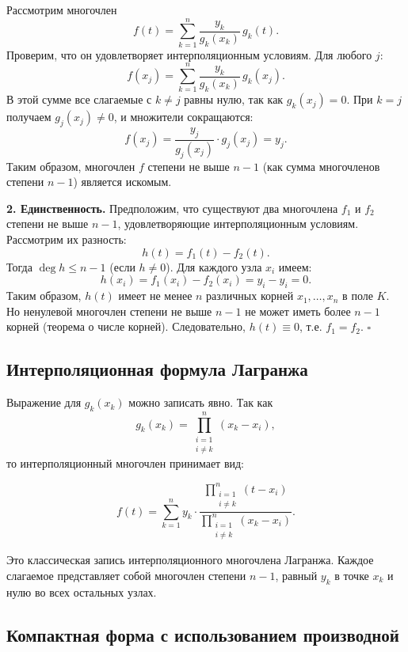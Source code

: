 \documentclass[a4paper,12pt]{article}
\theoremstyle{definition}
\theoremstyle{plain}
\theoremstyle{remark}
\begin{document}
	Рассмотрим многочлен
	\[
	f(t) = \sum_{k=1}^n \frac{y_k}{g_k(x_k)} \, g_k(t).
	\]
	Проверим, что он удовлетворяет интерполяционным условиям. Для любого \( j \):
	\[
	f(x_j) = \sum_{k=1}^n \frac{y_k}{g_k(x_k)} \, g_k(x_j).
	\]
	В этой сумме все слагаемые с \( k \neq j \) равны нулю, так как \( g_k(x_j) = 0 \). При \( k = j \) получаем \( g_j(x_j) \neq 0 \), и множители сокращаются:
	\[
	f(x_j) = \frac{y_j}{g_j(x_j)} \cdot g_j(x_j) = y_j.
	\]
	Таким образом, многочлен \( f \) степени не выше \( n-1 \) (как сумма многочленов степени \( n-1 \)) является искомым.
	
	\textbf{2. Единственность.} Предположим, что существуют два многочлена \( f_1 \) и \( f_2 \) степени не выше \( n-1 \), удовлетворяющие интерполяционным условиям. Рассмотрим их разность:
	\[
	h(t) = f_1(t) - f_2(t).
	\]
	Тогда \( \deg h \leq n-1 \) (если \( h \neq 0 \)). Для каждого узла \( x_i \) имеем:
	\[
	h(x_i) = f_1(x_i) - f_2(x_i) = y_i - y_i = 0.
	\]
	Таким образом, \( h(t) \) имеет не менее \( n \) различных корней \( x_1, \dots, x_n \) в поле \( K \). Но ненулевой многочлен степени не выше \( n-1 \) не может иметь более \( n-1 \) корней (теорема о числе корней). Следовательно, \( h(t) \equiv 0 \), т.е. \( f_1 = f_2 \). \hfill \(\square\)
	
	\subsection{Интерполяционная формула Лагранжа}
	
	Выражение для \( g_k(x_k) \) можно записать явно. Так как
	\[
	g_k(x_k) = \prod_{\substack{i=1 \\ i \neq k}}^n (x_k - x_i),
	\]
	то интерполяционный многочлен принимает вид:
	
	\begin{tcolorbox}[colback=yellow!5, colframe=orange!50!black, title=Формула Лагранжа]
		\[
		f(t) = \sum_{k=1}^n y_k \cdot \frac{\displaystyle\prod_{\substack{i=1 \\ i \neq k}}^n (t - x_i)}{\displaystyle\prod_{\substack{i=1 \\ i \neq k}}^n (x_k - x_i)}.
		\]
	\end{tcolorbox}
	
	Это классическая запись интерполяционного многочлена Лагранжа. Каждое слагаемое представляет собой многочлен степени \( n-1 \), равный \( y_k \) в точке \( x_k \) и нулю во всех остальных узлах.
	
	\subsection{Компактная форма с использованием производной}
	
\end{document}
